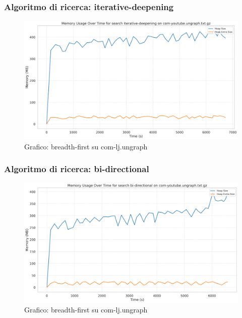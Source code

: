 \documentclass{article}
\begin{document}
\subsubsection{Algoritmo di ricerca: iterative-deepening}
\begin{figure}[h]\centering
\includegraphics[width=\textwidth]{../plots/com-youtube.ungraph_iterative-deepening.png}
\caption{Grafico: breadth-first su com-lj.ungraph}
\end{figure}
\subsubsection{Algoritmo di ricerca: bi-directional}
\begin{figure}[h]\centering
\includegraphics[width=\textwidth]{../plots/com-youtube.ungraph_bi-directional.png}
\caption{Grafico: breadth-first su com-lj.ungraph}
\end{figure}
\end{document}
